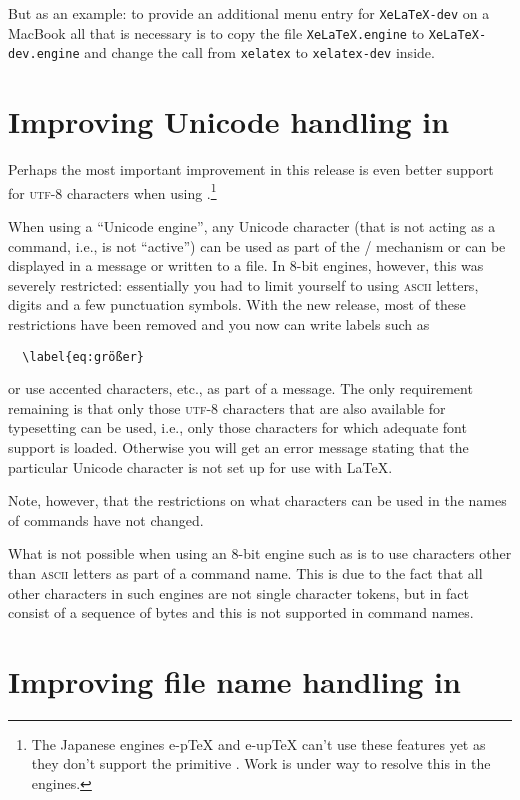 \documentclass{ltnews}
\providecommand\acro[1]{\textsc{#1}}
\providecommand\pdfTeX{\hologo{pdfTeX}}
\begin{document}
But as an example: to provide an additional menu entry for
\texttt{XeLaTeX-dev} on a MacBook all that is necessary is to copy
the file \texttt{XeLaTeX.engine} to \texttt{XeLaTeX-dev.engine} and change the
call from \texttt{xelatex} to \texttt{xelatex-dev} inside.




\section{Improving Unicode handling in \pdfTeX{}}

Perhaps the most important improvement in this release is
even
better support for \acro{utf}-8 characters when using \pdfTeX{}.\footnote{The
  Japanese engines e-p\TeX{} and e-up\TeX{} can't use these features
  yet as they don't support the primitive . Work is
  under way to resolve this in the engines.}

When using a \enquote{Unicode engine},  
any Unicode character (that is not acting as a command, 
i.e., is not \enquote{active}) 
can be used as part of the
/ mechanism or can be displayed in a message or
written to a file. In 8-bit engines, however, this was severely
restricted: 
essentially you had to limit yourself to using
\acro{ascii} letters, digits and a few punctuation symbols.  With the
new release, most of these restrictions have been removed and you now
can write labels such as
\begin{verbatim}
  \label{eq:größer}
\end{verbatim}
or use accented characters, etc., as part of a  message.
The only requirement remaining is that only those \acro{utf}-8 characters
that are also available for typesetting can be used, i.e., only those
characters for  
which adequate font support is loaded. Otherwise you will get an
error message stating that 
the 
particular Unicode character is not set
up for use with \LaTeX{}.

Note, however, that the restrictions on what characters can be 
used in the names of commands have not changed. 

What is not possible when using 
an 8-bit engine such as \pdfTeX{} is to use
characters other than \acro{ascii} letters as part of a command
name. This is due to the fact that all other characters in such
engines are not single character tokens, but in fact consist of a
sequence of bytes and this is not supported in command names.

\section{Improving file name handling in \pdfTeX{}}
\end{document}
